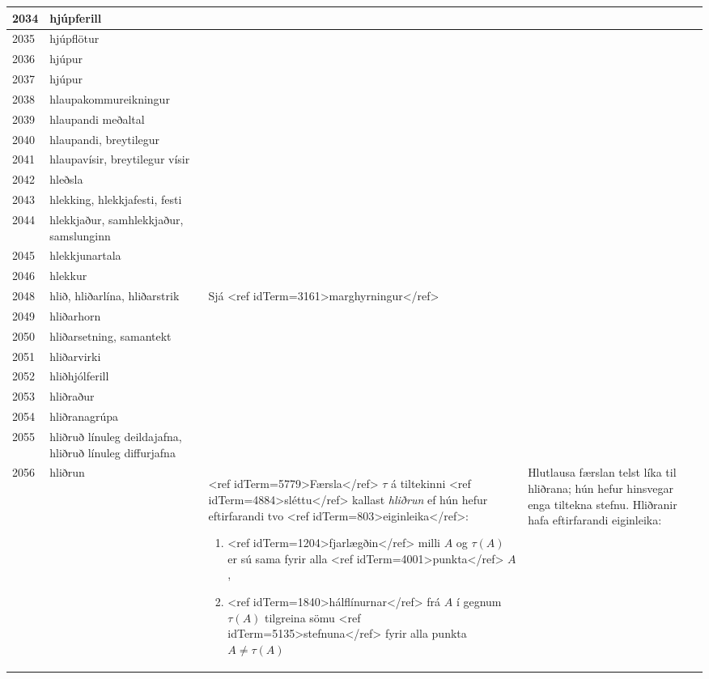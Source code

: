 \begin{longtable}{p{}|p{}|p{}|p{}|p{}}
\hline
2034 & hjúpferill &  &  &  \\
\hline
2035 & hjúpflötur &  &  &  \\
\hline
2036 & hjúpur &  &  &  \\
\hline
2037 & hjúpur &  &  &  \\
\hline
2038 & hlaupakommureikningur &  &  &  \\
\hline
2039 & hlaupandi meðaltal &  &  &  \\
\hline
2040 & hlaupandi, breytilegur &  &  &  \\
\hline
2041 & hlaupavísir, breytilegur vísir &  &  &  \\
\hline
2042 & hleðsla &  &  &  \\
\hline
2043 & hlekking, hlekkjafesti, festi &  &  &  \\
\hline
2044 & hlekkjaður, samhlekkjaður, samslunginn &  &  &  \\
\hline
2045 & hlekkjunartala &  &  &  \\
\hline
2046 & hlekkur &  &  &  \\
\hline
2048 & hlið, hliðarlína, hliðarstrik & Sjá <ref idTerm=3161>marghyrningur</ref> &  &  \\
\hline
2049 & hliðarhorn &  &  &  \\
\hline
2050 & hliðarsetning, samantekt &  &  &  \\
\hline
2051 & hliðarvirki &  &  &  \\
\hline
2052 & hliðhjólferill &  &  &  \\
\hline
2053 & hliðraður &  &  &  \\
\hline
2054 & hliðranagrúpa &  &  &  \\
\hline
2055 & hliðruð línuleg deildajafna, hliðruð línuleg diffurjafna &  &  &  \\
\hline
2056 & hliðrun & <ref idTerm=5779>Færsla</ref> $\tau$ á tiltekinni <ref idTerm=4884>sléttu</ref> kallast \textit{hliðrun} ef hún hefur eftirfarandi tvo <ref idTerm=803>eiginleika</ref>:

\begin{enumerate}
    \item <ref idTerm=1204>fjarlægðin</ref> milli $A$ og $\tau(A)$ er sú sama fyrir alla <ref idTerm=4001>punkta</ref> $A$,
    \item <ref idTerm=1840>hálflínurnar</ref> frá $A$ í gegnum $\tau(A)$ tilgreina sömu <ref idTerm=5135>stefnuna</ref> fyrir alla punkta $A \neq \tau(A)$
\end{enumerate} & Hlutlausa færslan telst líka til hliðrana; hún hefur hinsvegar enga tiltekna stefnu. Hliðranir hafa eftirfarandi eiginleika:


\end{longtable}
